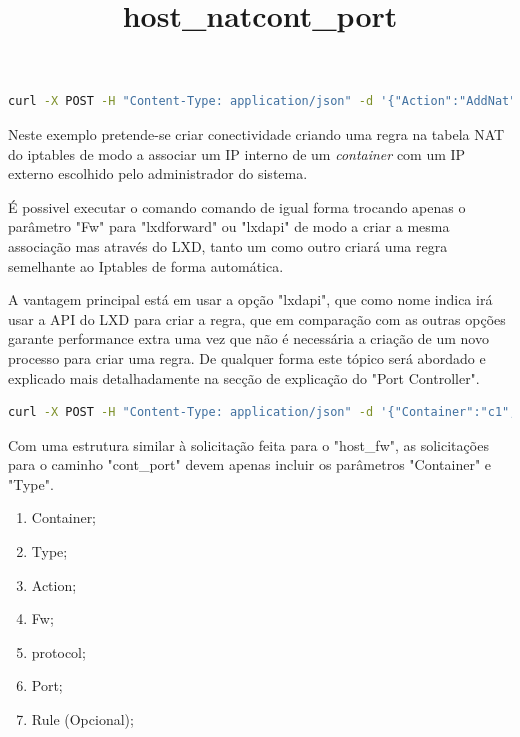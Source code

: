 \title*{\textbf{host\_nat}}

\begin{lstlisting}[language=Bash, caption={Exemplo de solicitação para a firewal do sistema host para associar um IP externo a umIp de container de modo a criar conectividade}]
    curl -X POST -H "Content-Type: application/json" -d '{"Action":"AddNat","Fw":"ipt", "Protocol":"tcp","Port":"22","External_ip":"192.168.1.120","Container_internal_ip":"10.195.171.205","Container_internal_port":"80" }' http://localhost:5000/host_nat
\end{lstlisting}

Neste exemplo pretende-se criar conectividade criando uma regra na tabela NAT do iptables de modo a associar
um IP interno de um \textit{container} com um IP externo escolhido pelo administrador do sistema.

É possivel executar o comando comando de igual forma trocando apenas o parâmetro "Fw" para "lxdforward" 
ou "lxdapi" de modo a criar a mesma associação mas através do LXD, tanto um como outro criará uma regra
semelhante ao Iptables de forma automática.

A vantagem principal está em usar a opção "lxdapi", que como nome indica irá usar a API do LXD para
criar a regra, que em comparação com as outras opções garante performance extra uma vez que não é necessária
a criação de um novo processo para criar uma regra. De qualquer forma este tópico será abordado e explicado mais detalhadamente 
na secção de explicação do "Port Controller". \\


\title*{\textbf{cont\_port}}

\begin{lstlisting}[language=Bash, caption={Exemplo de solicitação para a firewal do sistema host para associar um IP externo a umIp de container de modo a criar conectividade}]
    curl -X POST -H "Content-Type: application/json" -d '{"Container":"c1","Type":"lxc","Action":"OpenPort","Fw":"ipt", "Protocol":"tcp","Port":"22"}' http://localhost:5000/cont_port
\end{lstlisting}

Com uma estrutura similar à solicitação feita para o "host\_fw", as solicitações para o caminho "cont\_port"
devem apenas incluir os parâmetros "Container" e "Type".
\begin{enumerate}
    \item Container;
    \item Type;
    \item Action;
    \item Fw;
    \item protocol;
    \item Port;
    \item Rule (Opcional);
\end{enumerate}

